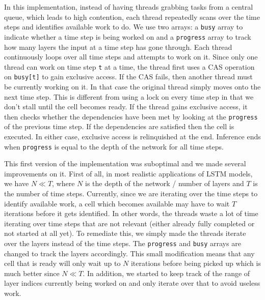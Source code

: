 \documentclass[12pt]{article}
\begin{document}
In this implementation, instead of having threads grabbing tasks from a central queue, which leads to high contention, each thread repeatedly scans over the time steps and identifies available work to do.
We use two arrays: a \verb|busy| array to indicate whether a time step is being worked on and a \verb|progress| array to track how many layers the input at a time step has gone through.
Each thread continuously loops over all time steps and attempts to work on it.
Since only one thread can work on time step \verb|t| at a time, the thread first uses a CAS operation on \verb|busy[t]| to gain exclusive access.
If the CAS fails, then another thread must be currently working on it. In that case the original thread simply moves onto the next time step.
This is different from using a lock on every time step in that we don't stall until the cell becomes ready.
If the thread gains exclusive access, it then checks whether the dependencies have been met by looking at the \verb|progress| of the previous time step.
If the dependencies are satisfied then the cell is executed.
In either case, exclusive access is relinquished at the end.
Inference ends when \verb|progress| is equal to the depth of the network for all time steps.

This first version of the implementation was suboptimal and we made several improvements on it.
First of all, in most realistic applications of LSTM models, we have $N \ll T$, where $N$ is the depth of the network / number of layers and $T$ is the number of time steps.
Currently, since we are iterating over the time steps to identify available work, a cell which becomes available may have to wait $T$ iterations before it gets identified.
In other words, the threads waste a lot of time iterating over time steps that are not relevant (either already fully completed or not started at all yet).
To remediate this, we simply made the threads iterate over the layers instead of the time steps.
The \verb|progress| and \verb|busy| arrays are changed to track the layers accordingly.
This small modification means that any cell that is ready will only wait up to $N$ iterations before being picked up which is much better since $N \ll T$.
In addition, we started to keep track of the range of layer indices currently being worked on and only iterate over that to avoid useless work.
\end{document}
